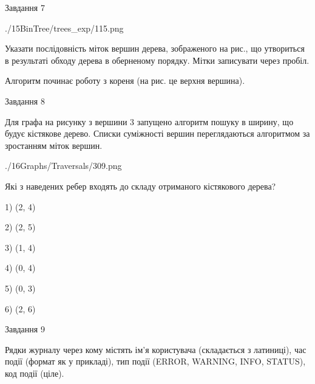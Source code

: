 \documentclass[12pt, ukrainian]{article}
\begin{document}
{\vspace{10mm}\par

\newpage
\begin{minipage}[t]{9.7cm}
               
{\begin{center}Завдання {7}\end{center}}
\vspace{-6mm}

\begin{center}
	{./15BinTree/trees_exp/115.png}
\end{center}
Указати послідовність міток вершин дерева, зображеного на рис., що утвориться в результаті обходу дерева в оберненому порядку. Мітки записувати через пробіл.\par Алгоритм починає роботу з кореня (на рис. це верхня вершина).\par

\end{minipage}
\vline \hspace{8mm}
\begin{minipage}[t]{8.0cm}
               
{\begin{center}Завдання {8}\end{center}}
\vspace{-6mm}
Для графа на рисунку з вершини 3 запущено алгоритм пошуку в ширину, що будує кістякове дерево. Списки суміжності вершин переглядаються алгоритмом за зростанням міток вершин.\par
\begin{center}
	{./16Graphs/Traversals/309.png}
\end{center}
\par Які з наведених ребер входять до складу отриманого кістякового дерева?\par
1) (2, 4)\par
2) (2, 5)\par
3) (1, 4)\par
4) (0, 4)\par
5) (0, 3)\par
6) (2, 6)\par
{\vskip 15pt} \par

\end{minipage}

               
{\begin{center}Завдання {9}\end{center}}
\vspace{-6mm}
Рядки журналу через кому містять ім'я користувача (складається з латиниці), час події (фор\-мат як у прикладі), тип події (ERROR, WARNING, INFO, STATUS), код події (ціле).

}
\end{document}
